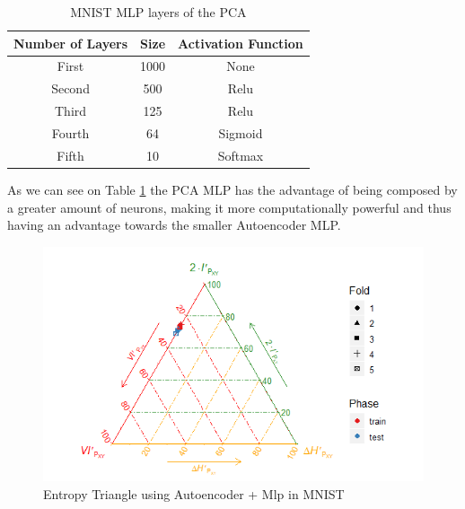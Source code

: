 \begin{table}[H]
	\caption{MNIST MLP layers of the PCA}
	\begin{center}
		\label{tab:table_MNIST_MLP_pca}
		\begin{tabular}{c|c|c} %
			\textbf{Number of Layers} & \textbf{Size} & \textbf{Activation Function} \\
			\hline
			First & 1000 & None\\
			Second & 500 & Relu\\
			Third & 125  & Relu\\
			Fourth & 64 & Sigmoid\\
			Fifth & 10 & Softmax \\
		\end{tabular}
	\end{center}
\end{table}

As we can see on Table \ref{tab:table_MNIST_MLP_pca} the PCA MLP has the advantage of being composed by a greater amount of neurons, making it more computationally powerful and thus having an advantage towards the smaller Autoencoder MLP. 


\begin{figure}[H]
	\centering
	\includegraphics[width=1\linewidth]{Figuras_tfg/MNIST_Autoencoder_mlp}
	\caption{Entropy Triangle using Autoencoder + Mlp in MNIST}
	\label{fig:figure_Mlp_MNIST_ET_Auto}
\end{figure}

